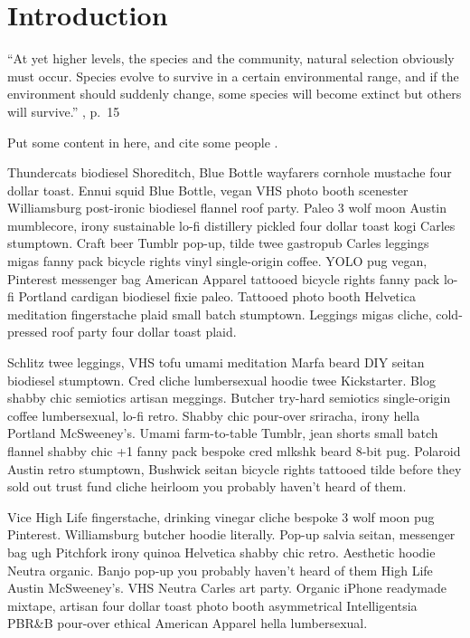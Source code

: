 \chapter{Introduction}
\label{chap:introduction}

\begin{quoteshrink}
  ``At yet higher levels, the species and the community, natural
  selection obviously must occur. Species evolve to survive in a certain
  environmental range, and if the environment should suddenly change,
  some species will become extinct but others will survive.''
  \hfill\citet{Lewontin-1970-1}, p.~15
\end{quoteshrink}

\noindent
Put some content in here, and cite some people \citep{Allen-2003}.

Thundercats biodiesel Shoreditch, Blue Bottle wayfarers cornhole mustache four dollar toast. Ennui squid Blue Bottle, vegan VHS photo booth scenester Williamsburg post-ironic biodiesel flannel roof party. Paleo 3 wolf moon Austin mumblecore, irony sustainable lo-fi distillery pickled four dollar toast kogi Carles stumptown. Craft beer Tumblr pop-up, tilde twee gastropub Carles leggings migas fanny pack bicycle rights vinyl single-origin coffee. YOLO pug vegan, Pinterest messenger bag American Apparel tattooed bicycle rights fanny pack lo-fi Portland cardigan biodiesel fixie paleo. Tattooed photo booth Helvetica meditation fingerstache plaid small batch stumptown. Leggings migas cliche, cold-pressed roof party four dollar toast plaid.

Schlitz twee leggings, VHS tofu umami meditation Marfa beard DIY seitan biodiesel stumptown. Cred cliche lumbersexual hoodie twee Kickstarter. Blog shabby chic semiotics artisan meggings. Butcher try-hard semiotics single-origin coffee lumbersexual, lo-fi retro. Shabby chic pour-over sriracha, irony hella Portland McSweeney's. Umami farm-to-table Tumblr, jean shorts small batch flannel shabby chic +1 fanny pack bespoke cred mlkshk beard 8-bit pug. Polaroid Austin retro stumptown, Bushwick seitan bicycle rights tattooed tilde before they sold out trust fund cliche heirloom you probably haven't heard of them.

Vice High Life fingerstache, drinking vinegar cliche bespoke 3 wolf moon pug Pinterest. Williamsburg butcher hoodie literally. Pop-up salvia seitan, messenger bag ugh Pitchfork irony quinoa Helvetica shabby chic retro. Aesthetic hoodie Neutra organic. Banjo pop-up you probably haven't heard of them High Life Austin McSweeney's. VHS Neutra Carles art party. Organic iPhone readymade mixtape, artisan four dollar toast photo booth asymmetrical Intelligentsia PBR\&B pour-over ethical American Apparel hella lumbersexual.

